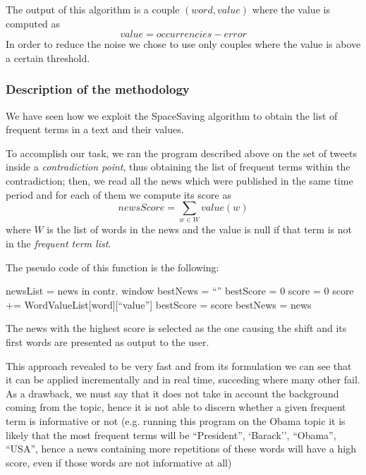 The output of this algorithm is a couple $(word, value)$ where the value is
computed as 
\begin{displaymath}
	value = occurrencies - error
\end{displaymath}
In order to reduce the noise we chose to use only couples where the value is
above a certain threshold.

\subsubsection*{Description of the methodology}
We have seen how we exploit the SpaceSaving algorithm to obtain the list of
frequent terms in a text and their
values. 

To accomplish our task, we ran the program described above on the set of tweets inside a
\emph{contradiction point}, thus obtaining the list of frequent terms within the
contradiction; then, we read all the news which were published in the same time
period and for each of them we compute its score as
\begin{displaymath}
	newsScore = \sum_{w \in W} value(w)
\end{displaymath}
where $W$ is the list of words in the news and the value is null if that term is
not in the \emph{frequent term list}.

The pseudo code of this function is the following:
\begin{algorithmic}
\STATE newsList = news in contr. window
\STATE bestNews = ``''
\STATE bestScore = 0
	\STATE score = 0
			\STATE score += WordValueList[word][``value'']
		\ELSE {}
			\STATE bestScore = score
			\STATE bestNews = news
		\ENDIF \ENDIF
	\ENDFOR
\ENDFOR
\end{algorithmic}
The news with the highest score is selected as the one causing the shift and its
first words are presented as output to the user.

This approach revealed to be very fast and from its formulation we can see that
it can be applied incrementally and in real time, succeding where many other fail. As a drawback, we must say that it does not
take in account the background coming from the topic, hence it is not able to
discern whether a given frequent term is informative or not (e.g. running this
program on the Obama topic it is likely that the most
frequent terms will be ``President'', `Barack'', ``Obama'', ``USA'', hence a
news containing more repetitions of these words will have a high score, even if
those words are not informative at all)

